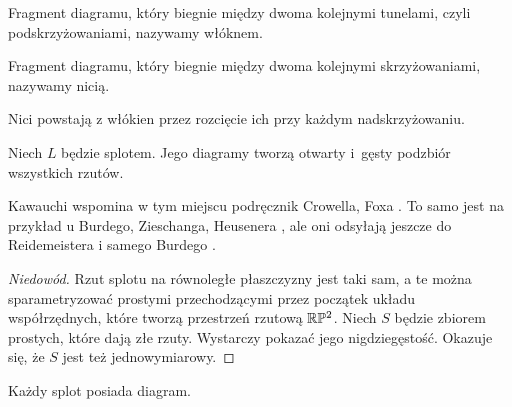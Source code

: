 \begin{definition}[włókno]
%
    Fragment diagramu, który biegnie między dwoma kolejnymi tunelami, czyli podskrzyżowaniami, nazywamy włóknem.
\end{definition}

\begin{definition}[nić]
%
    Fragment diagramu, który biegnie między dwoma kolejnymi skrzyżowaniami, nazywamy nicią.
\end{definition}

Nici powstają z włókien przez rozcięcie ich przy każdym nadskrzyżowaniu.

\begin{proposition}
\label{prp:links_have_diagrams}%
    Niech $L$ będzie splotem.
    Jego diagramy tworzą otwarty i~gęsty podzbiór wszystkich rzutów.
\end{proposition}

Kawauchi \cite[s. 7]{kawauchi1996} wspomina w tym miejscu podręcznik Crowella, Foxa \cite[s. 7]{crowell1963}.
To samo jest na przykład u Burdego, Zieschanga, Heusenera \cite[s. 10]{burde2014}, ale oni odsyłają jeszcze do Reidemeistera \cite{reidemeister1927} i samego Burdego \cite{burde1978}.

\begin{proof}[Niedowód]
    Rzut splotu na równoległe płaszczyzny jest taki sam, a te można sparametryzować prostymi przechodzącymi przez początek układu współrzędnych, które tworzą przestrzeń rzutową $\mathbb R \mathbb P^2$.
    Niech $S$ będzie zbiorem prostych, które dają złe rzuty.
    Wystarczy pokazać jego nigdziegęstość.
    Okazuje się, że $S$ jest też jednowymiarowy.
\end{proof}

\begin{corollary}
    Każdy splot posiada diagram.
\end{corollary}













